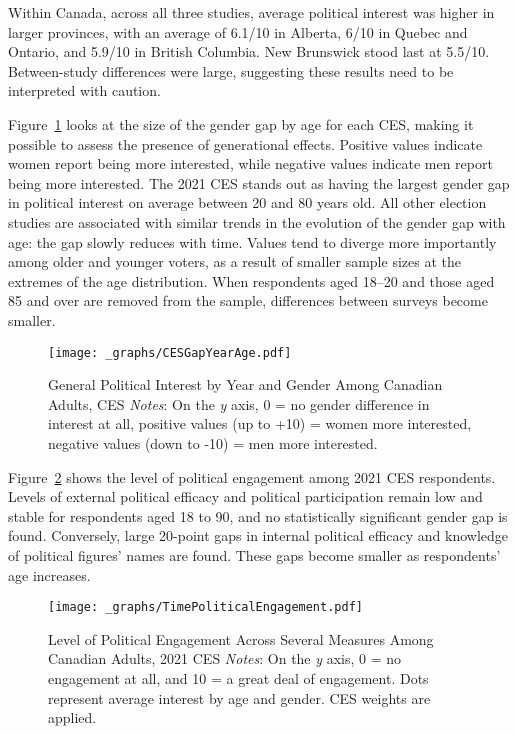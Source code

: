 \documentclass[
  letterpaper,
  DIV=11,
  numbers=noendperiod]{scrreprt}
\begin{document}
Within Canada, across all three studies, average political interest was
higher in larger provinces, with an average of 6.1/10 in Alberta, 6/10
in Quebec and Ontario, and 5.9/10 in British Columbia. New Brunswick
stood last at 5.5/10. Between-study differences were large, suggesting
these results need to be interpreted with caution.

Figure~\ref{fig-cesgapyearage} looks at the size of the gender gap by
age for each CES, making it possible to assess the presence of
generational effects. Positive values indicate women report being more
interested, while negative values indicate men report being more
interested. The 2021 CES stands out as having the largest gender gap in
political interest on average between 20 and 80 years old. All other
election studies are associated with similar trends in the evolution of
the gender gap with age: the gap slowly reduces with time. Values tend
to diverge more importantly among older and younger voters, as a result
of smaller sample sizes at the extremes of the age distribution. When
respondents aged 18--20 and those aged 85 and over are removed from the
sample, differences between surveys become smaller.

\begin{figure}

{\centering \texttt{[image: \_graphs/CESGapYearAge.pdf]}

}

\caption{\label{fig-cesgapyearage}General Political Interest by Year and
Gender Among Canadian Adults, CES \newline \textit{Notes}: On the
\textit{y} axis, 0 = no gender difference in interest at all, positive
values (up to +10) = women more interested, negative values (down to
-10) = men more interested.}

\end{figure}

Figure~\ref{fig-timepoliticalengagement} shows the level of political
engagement among 2021 CES respondents. Levels of external political
efficacy and political participation remain low and stable for
respondents aged 18 to 90, and no statistically significant gender gap
is found. Conversely, large 20-point gaps in internal political efficacy
and knowledge of political figures' names are found. These gaps become
smaller as respondents' age increases.

\begin{figure}

{\centering \texttt{[image: \_graphs/TimePoliticalEngagement.pdf]}

}

\caption{\label{fig-timepoliticalengagement}Level of Political
Engagement Across Several Measures Among Canadian Adults, 2021 CES
\newline \textit{Notes}: On the \textit{y} axis, 0 = no engagement at
all, and 10 = a great deal of engagement. Dots represent average
interest by age and gender. CES weights are applied.}

\end{figure}
\end{document}
